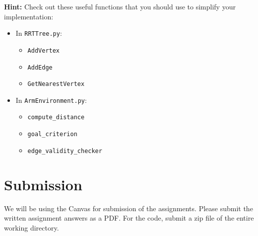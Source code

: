\documentclass[tp]{lcc}
\begin{document}
\textbf{Hint:}
Check out these useful functions that you should use to simplify your implementation:
\begin{itemize}
    \item In \texttt{RRTTree.py}:
    \begin{itemize}
        \item \texttt{AddVertex}
        \item \texttt{AddEdge}
        \item \texttt{GetNearestVertex}
    \end{itemize}
    \item In \texttt{ArmEnvironment.py}:
    \begin{itemize}
        \item \texttt{compute\_distance}
        \item \texttt{goal\_criterion}
        \item \texttt{edge\_validity\_checker}
    \end{itemize}
\end{itemize}

\section{Submission}
We will be using the Canvas for submission of the assignments. Please submit the written assignment answers as a PDF. For the code, submit a zip file of the entire working directory.

\printbibliography
\end{document}
